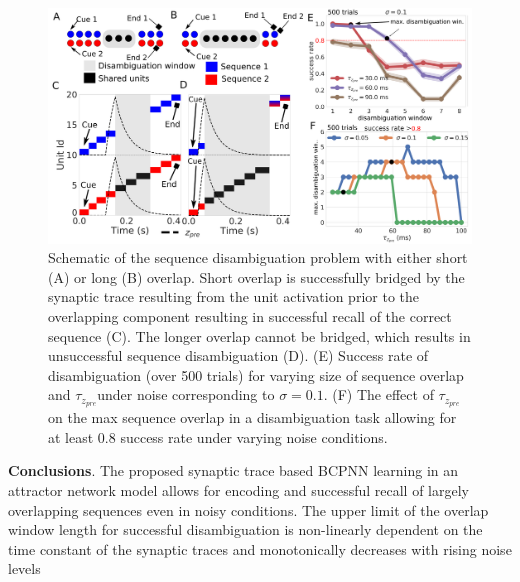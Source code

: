 \documentclass[12pt, a4paper]{article}
\begin{document}
\begin{figure}[H]
\centering
\includegraphics[scale=0.25]{results.png}
\caption{Schematic of the sequence disambiguation problem with either short (A) or long (B) overlap. Short overlap is successfully bridged by the synaptic trace resulting from the unit activation prior to the overlapping component resulting in successful recall of the correct sequence (C). The longer overlap cannot be bridged, which results in unsuccessful sequence disambiguation (D). (E) Success rate of disambiguation (over 500 trials) for varying size of sequence overlap and $\tau_{z_{pre}}$under noise corresponding to $\sigma = 0.1$.  (F) The effect of $\tau_{z_{pre}}$ on the max sequence overlap in a disambiguation task allowing for at least 0.8 success rate under varying noise conditions.}
\label{fig:results}
\end{figure}

\textbf{Conclusions}. The proposed synaptic trace based BCPNN learning in an attractor network model allows for encoding and successful recall of largely overlapping sequences even in noisy conditions. The upper limit of the overlap window length for successful disambiguation is non-linearly dependent on the time constant of the synaptic traces and monotonically decreases with rising noise levels

%



\end{document}
